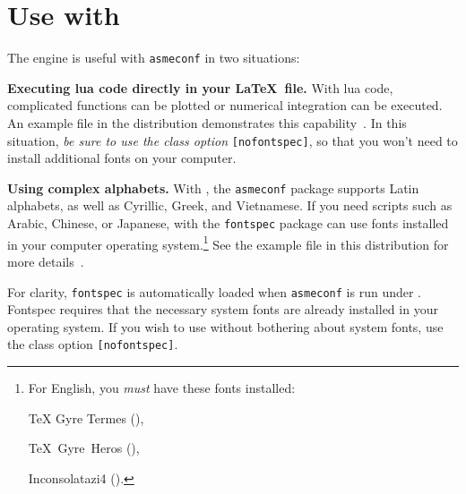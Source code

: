 \documentclass[captionpatch,colorlinks,upint,subscriptcorrection,varvw,german]{asmeconf}
\begin{document}
\section[Use with LuaLaTeX]{Use with }\label{appendix:b}

The  engine is useful with \texttt{asmeconf} in two situations:

\begin{description}

\item \textbf{Executing lua code directly in your \LaTeX\ file.} With lua code, complicated functions can be plotted or numerical integration can be executed. An example file in the distribution demonstrates this capability~\cite{lienhard2024}. In this situation, \textit{be sure to use the class option} \texttt{[nofontspec]}, so that you won't need to install additional fonts on your computer. 

\item \textbf{Using complex alphabets.} With , the \texttt{asmeconf} package supports Latin alphabets, as well as Cyrillic, Greek, and Vietnamese. If you need scripts such as Arabic, Chinese, or Japanese,  with the \texttt{fontspec} package can use fonts installed in your computer operating system.\footnote{For English, you \textit{must} have these fonts installed:\par \parbox{\columnwidth}{\setlength{\parindent}{12pt}TeX Gyre Termes (),\par TeX~Gyre~Heros (),\par 
Inconsolatazi4 ().}} See the example file in this distribution for more details~\cite{lienhard2021}.


\end{description}


For clarity, \texttt{fontspec} is automatically loaded when \texttt{asmeconf} is run under . Fontspec requires that the necessary system fonts are already installed in your operating system.  If you wish to use  without bothering about system fonts, use the class option \texttt{[nofontspec]}. 
\end{document}
